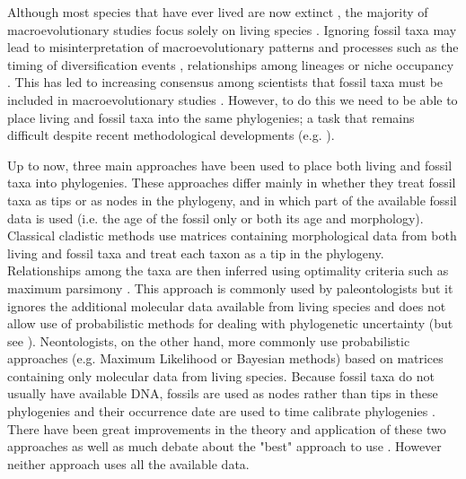 \documentclass[12pt,letterpaper]{article}
\begin{document}
Although most species that have ever lived are now extinct \citep{novacek1992ext,raup1993extinction}, the majority of macroevolutionary studies focus solely on living species \citep[e.g.][]{meredithimpacts2011,jetzthe2012}.  Ignoring fossil taxa may lead to misinterpretation of macroevolutionary patterns and processes such as the timing of diversification events \citep[e.g.][]{pyrondivergence2011}, relationships among lineages \citep[e.g.][]{manosphylogeny2007} or niche occupancy \citep[e.g.][]{pearmanniche2008}. This has led to increasing consensus among scientists that fossil taxa must be included in macroevolutionary studies \citep{jacksonwhat2006,quentaldiversity2010,dietlconservation2011,slaterunifying2013,fritzdiversity2013}. However, to do this we need to be able to place living and fossil taxa into the same phylogenies; a task that remains difficult despite recent methodological developments (e.g. \citealp{pyrondivergence2011,ronquista2012,schragocombining2013}). %

Up to now, three main approaches have been used to place both living and fossil taxa into phylogenies. These approaches differ mainly in whether they treat fossil taxa as tips or as nodes in the phylogeny, and in which part of the available fossil data is used (i.e. the age of the fossil only or both its age and morphology). Classical cladistic methods use matrices containing morphological data from both living and fossil taxa and treat each taxon as a tip in the phylogeny. Relationships among the taxa are then inferred using optimality criteria such as maximum parsimony \citep{simpson1945}. This approach is commonly used by paleontologists but it ignores the additional molecular data available from living species and does not allow use of probabilistic methods for dealing with phylogenetic uncertainty (but see \citealp{spencerefficacy2013}). Neontologists, on the other hand, more commonly use probabilistic approaches (e.g. Maximum Likelihood or Bayesian methods) based on matrices containing only molecular data from living species. Because fossil taxa do not usually have available DNA, fossils are used as nodes rather than tips in these phylogenies and their occurrence date are used to time calibrate phylogenies \citep{zuckerkandl1965}. There have been great improvements in the theory and application of these two approaches \citep[e.g.][]{bapsta2013,stadlerdating2013,heaththe2013} as well as much debate about the "best" approach to use \citep[e.g.][]{spencerefficacy2013}. However neither approach uses all the available data.
\end{document}
